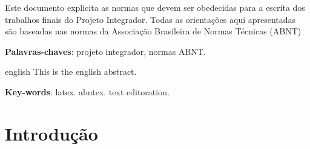 \documentclass[
	12pt,				%
	openright,			%
	oneside,			%
	a4paper,			%
	english,			%
	french,				%
	spanish,			%
	brazil				%
	]{abntex2}
\begin{document}

\setlength{\absparsep}{18pt} %
\begin{resumo}
Este documento explicita as normas que devem ser obedecidas para a escrita dos trabalhos finais do Projeto Integrador. Todas as orientações aqui apresentadas são baseadas nas normas da Associação Brasileira de Normas Técnicas (ABNT) %

 \textbf{Palavras-chaves}: projeto integrador, normas ABNT.
\end{resumo}

\begin{resumo}[Abstract]
 \begin{otherlanguage*}{english}
   This is the english abstract.

   \vspace{\onelineskip}
 
   \noindent 
   \textbf{Key-words}: latex. abntex. text editoration.
 \end{otherlanguage*}
\end{resumo}




\listoffigures*
\cleardoublepage

\listoftables*
\cleardoublepage


\tableofcontents*
\cleardoublepage

\textual

\chapter*[Introdução]{Introdução}
\end{document}
